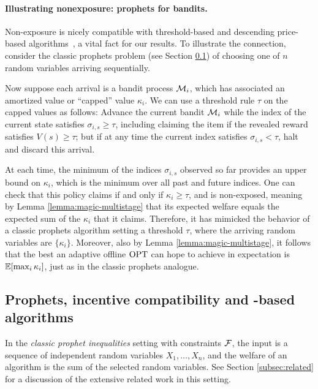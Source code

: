 \paragraph{Illustrating nonexposure: prophets for bandits.}
Non-exposure is nicely compatible with threshold-based and descending price-based algorithms~\citep{kleinberg2016descending,singla2018price}, a vital fact for our results.
To illustrate the connection, consider the classic prophets problem (see Section \ref{subsec:prophet-framework}) of choosing one of $n$ random variables arriving sequentially.

Now suppose each arrival is a bandit process $\mathcal{M}_i$, which has associated an amortized value or ``capped'' value $\kappa_i$.
We can use a threshold rule $\tau$ on the capped values as follows: Advance the current bandit $\mathcal{M}_i$ while the index of the current state satisfies $\sigma_{i,s} \geq \tau$, including claiming the item if the revealed reward satisfies $V(s) \geq \tau$; but if at any time the current index satisfies $\sigma_{i,s} < \tau$, halt and discard this arrival.

At each time, the minimum of the indices $\sigma_{i,s}$ observed so far provides an upper bound on $\kappa_i$, which is the minimum over all past and future indices.
One can check that this policy claims if and only if $\kappa_i \geq \tau$, and is non-exposed, meaning by Lemma \ref{lemma:magic-multistage} that its expected welfare equals the expected sum of the $\kappa_i$ that it claims.
Therefore, it has mimicked the behavior of a classic prophets algorithm setting a threshold $\tau$, where the arriving random variables are $\{\kappa_i\}$.
Moreover, also by Lemma \ref{lemma:magic-multistage}, it follows that the best an adaptive offline $\mathrm{OPT}$ can hope to achieve in expectation is $\operatorname*{\mathbb{E}} [\max_i \kappa_i]$, just as in the classic prophets analogue.







\subsection{Prophets, incentive compatibility and \SAUP{}-based algorithms}\label{subsec:prophet-framework}

In the \emph{classic prophet inequalities} setting with constraints $\mathcal{F}$, the input is a sequence of independent random variables $X_1,\dots,X_n$, and the welfare of an algorithm is the sum of the selected random variables.
See Section \ref{subsec:related} for a discussion of the extensive related work in this setting.

